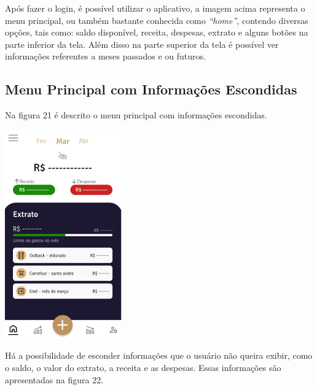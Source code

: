 Após fazer o login, é possível utilizar o aplicativo, a imagem acima representa o menu principal, ou também bastante conhecida como \textit{“home”}, contendo diversas opções, tais como: saldo disponível, receita, despesas, extrato e alguns botões na parte inferior da tela. Além disso na parte superior da tela é possível ver informações referentes a meses passados e ou futuros. 

\subsection{Menu Principal com Informações Escondidas}

Na figura 21 é descrito o menu principal com informações escondidas.

    \vspace{\baselineskip}
    \begin{center}
        \begin{minipage}{\textwidth}
            \centering
            \includegraphics[scale=0.6]{figs/img_455_menuescondido.png}
            \label{fig:figura21}
        \end{minipage}
    \end{center}  

Há a possibilidade de esconder informações que o usuário não queira exibir, como o saldo, o valor do extrato, a receita e as despesas. Essas informações são apresentadas na figura 22.

